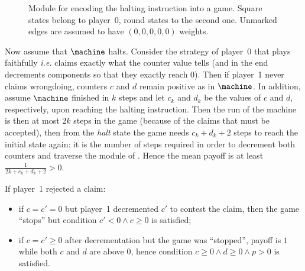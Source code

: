 \begin{figure}
\centering
{}
\caption[Module for encoding the halting instruction into a game.]{Module for encoding the halting instruction into a game. Square states belong to player~0, round states to the second one. Unmarked edges are assumed to have $(0,0,0,0,0)$ weights.}
\label{tj:fig:halt}
\end{figure}

Now assume that $\machine$ halts.
Consider the strategy of player~0 that plays faithfully \emph{i.e.} claims exactly what the counter value tells (and in the end decrements components so that they exactly reach $0$).
Then if player~1 never claims wrongdoing, counters $c$ and $d$ remain positive as in $\machine$.
In addition, assume $\machine$ finished in $k$ steps and let $c_k$ and $d_k$ be the values of $c$ and $d$, respectively, upon reaching the halting instruction.
Then the run of the machine is then at most $2k$ steps in the game (because of the claims that must be accepted), then from the \emph{halt} state the game needs $c_k+d_k+2$ steps to reach the initial state again: it is the number of steps required in order to decrement both counters and traverse the module of .
Hence the mean payoff is at least $\frac1{2k+c_k+d_k+2}>0$.

If player~1 rejected a claim:
\begin{itemize}
\item if $c=c'=0$ but player~1 decremented $c'$ to contest the claim, then the game ``stops'' but condition $c'<0 \wedge c\geq0$ is satisfied;
\item if $c=c'\geq0$ after decrementation but the game was ``stopped'', payoff is $1$ while both $c$ and $d$ are above $0$, hence condition $c\geq0 \wedge d\geq0 \wedge p>0$ is satisfied.
\end{itemize}

